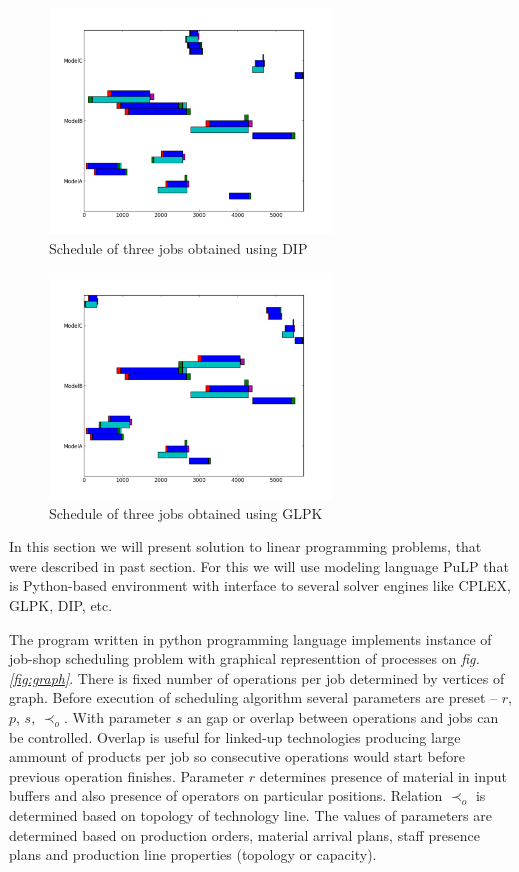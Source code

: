 \documentclass[a4paper,journal,twocolumn]{IEEEtran}
\begin{document}
\begin{figure}[h]%
  \includegraphics[width=75mm]{gantt1}
  \centering 
  \caption{Schedule of three jobs obtained using DIP}
  \label{fig:gantt1}
\end{figure}

\begin{figure}[h]%
  \includegraphics[width=75mm]{gantt2}
  \centering 
  \caption{Schedule of three jobs obtained using GLPK}
  \label{fig:gantt2}
\end{figure}

In this section we will present solution to linear programming problems, that were described in past section.
For this we will use modeling language PuLP that is Python-based environment with interface to several solver engines like CPLEX, GLPK, DIP, etc.

The program written in python programming language implements instance of
job-shop scheduling problem with graphical representtion of processes on \emph{fig. \ref{fig:graph}}.
There is fixed number of operations per job determined by vertices of graph.
Before execution of scheduling algorithm several parameters are preset -- $r$, $p$, $s$, $\prec_o$. 
With parameter $s$ an gap or overlap between operations and jobs can be controlled.
Overlap is useful for linked-up technologies producing large ammount of products per job so consecutive operations
would start before previous operation finishes. Parameter $r$ determines presence of material in input buffers and also 
presence of operators on particular positions. Relation $\prec_o$ is determined based on topology of technology line.
The values of parameters are determined based on production orders, material arrival plans, staff presence plans and
production line properties (topology or capacity).
\end{document}
